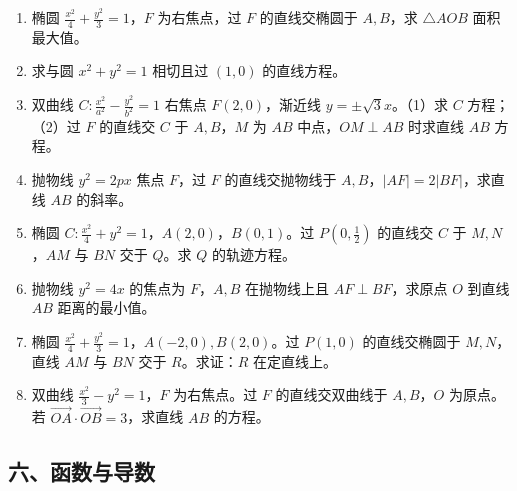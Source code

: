 \begin{enumerate}
  \item[★] 椭圆 $\frac{x^2}{4}+\frac{y^2}{3}=1$，$F$ 为右焦点，过 $F$ 的直线交椭圆于 $A,B$，求 $\triangle AOB$ 面积最大值。
  \vspace{3cm}
  \item[★] 求与圆 $x^2+y^2=1$ 相切且过 $(1,0)$ 的直线方程。
  \vspace{2cm}
  \item[★★] 双曲线 $C:\frac{x^2}{a^2}-\frac{y^2}{b^2}=1$ 右焦点 $F(2,0)$，渐近线 $y=\pm\sqrt3x$。（1）求 $C$ 方程；（2）过 $F$ 的直线交 $C$ 于 $A,B$，$M$ 为 $AB$ 中点，$OM\perp AB$ 时求直线 $AB$ 方程。
  \vspace{4cm}
  \item[★★] 抛物线 $y^2=2px$ 焦点 $F$，过 $F$ 的直线交抛物线于 $A,B$，$|AF|=2|BF|$，求直线 $AB$ 的斜率。
  \vspace{3cm}
  \item[★★] 椭圆 $C:\frac{x^2}{4}+y^2=1$，$A(2,0)$，$B(0,1)$。过 $P(0,\frac12)$ 的直线交 $C$ 于 $M,N$，$AM$ 与 $BN$ 交于 $Q$。求 $Q$ 的轨迹方程。
  \vspace{4cm}
  \item[★★] 抛物线 $y^2=4x$ 的焦点为 $F$，$A,B$ 在抛物线上且 $AF\perp BF$，求原点 $O$ 到直线 $AB$ 距离的最小值。
  \vspace{4cm}
  \item[★★★] 椭圆 $\frac{x^2}{4}+\frac{y^2}{3}=1$，$A(-2,0),B(2,0)$。过 $P(1,0)$ 的直线交椭圆于 $M,N$，直线 $AM$ 与 $BN$ 交于 $R$。求证：$R$ 在定直线上。
  \vspace{4cm}
  \item[★★★] 双曲线 $\frac{x^2}{3}-y^2=1$，$F$ 为右焦点。过 $F$ 的直线交双曲线于 $A,B$，$O$ 为原点。若 $\overrightarrow{OA}\cdot\overrightarrow{OB}=3$，求直线 $AB$ 的方程。
  \vspace{4cm}
\end{enumerate}

\subsection{六、函数与导数}

